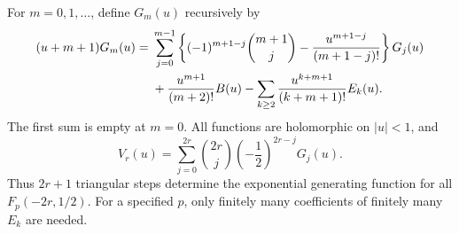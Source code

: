 \begin{theorem}
\label{hpnew:generator}
For $m=0,1,\ldots$, define $G_m(u)$ recursively by
\begin{align}
 (u+m+1)G_m(u)
 ={}&\sum_{j=0}^{m-1}
 \left\{(-1)^{m+1-j}\binom{m+1}{j}
             -\frac{u^{m+1-j}}{(m+1-j)!}\right\}G_j(u)\notag\\
 &+\frac{u^{m+1}}{(m+2)!}B(u)
 -\sum_{k\ge2}\frac{u^{k+m+1}}{(k+m+1)!}E_k(u).
 \label{hpnew:Grecurrence}
\end{align}
The first sum is empty at $m=0$. All functions are holomorphic on
$|u|<1$, and
\begin{equation}\label{hpnew:Vrecurrence}
 \boxed{\displaystyle
 V_r(u)=\sum_{j=0}^{2r}\binom{2r}{j}
                     \left(-\frac12\right)^{2r-j}G_j(u).}
\end{equation}
Thus $2r+1$ triangular steps determine the exponential generating
function for all $F_p(-2r,1/2)$. For a specified $p$, only finitely
many coefficients of finitely many $E_k$ are needed.
\end{theorem}

